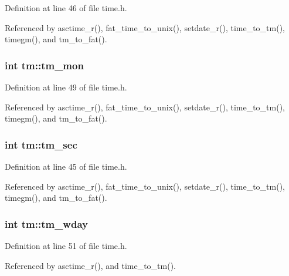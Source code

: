 Definition at line 46 of file time.\-h.



Referenced by asctime\-\_\-r(), fat\-\_\-time\-\_\-to\-\_\-unix(), setdate\-\_\-r(), time\-\_\-to\-\_\-tm(), timegm(), and tm\-\_\-to\-\_\-fat().

\hypertarget{structtm_a112ac36fa2f593777138a417cf031e17}{
\subsubsection[{tm\-\_\-mon}]{\setlength{\rightskip}{0pt plus 5cm}int tm\-::tm\-\_\-mon}}\label{structtm_a112ac36fa2f593777138a417cf031e17}


Definition at line 49 of file time.\-h.



Referenced by asctime\-\_\-r(), fat\-\_\-time\-\_\-to\-\_\-unix(), setdate\-\_\-r(), time\-\_\-to\-\_\-tm(), timegm(), and tm\-\_\-to\-\_\-fat().

\hypertarget{structtm_a4d098a9a5c03a00b2ee61e10851de81e}{
\subsubsection[{tm\-\_\-sec}]{\setlength{\rightskip}{0pt plus 5cm}int tm\-::tm\-\_\-sec}}\label{structtm_a4d098a9a5c03a00b2ee61e10851de81e}


Definition at line 45 of file time.\-h.



Referenced by asctime\-\_\-r(), fat\-\_\-time\-\_\-to\-\_\-unix(), setdate\-\_\-r(), time\-\_\-to\-\_\-tm(), timegm(), and tm\-\_\-to\-\_\-fat().

\hypertarget{structtm_afe81a8c46f1c693c43f259b288859f4f}{
\subsubsection[{tm\-\_\-wday}]{\setlength{\rightskip}{0pt plus 5cm}int tm\-::tm\-\_\-wday}}\label{structtm_afe81a8c46f1c693c43f259b288859f4f}


Definition at line 51 of file time.\-h.



Referenced by asctime\-\_\-r(), and time\-\_\-to\-\_\-tm().

